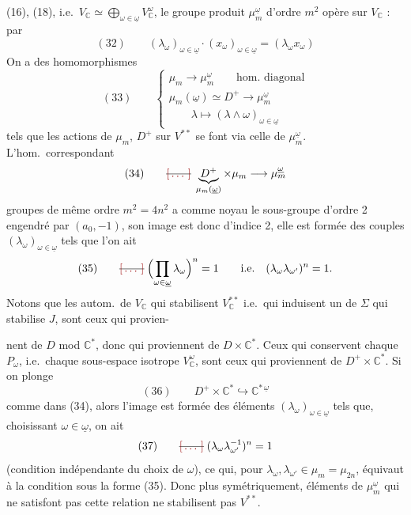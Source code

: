 \documentclass[11pt,a4paper]{article}
\begin{document}
(16), (18), i.e.\ $V_{\mathbb{C}} \simeq \bigoplus_{\omega \in
\underline{\omega}} V_{\mathbb{C}}^{\omega}$,  le groupe
produit $\mu_m^{\underline{\omega}}$ d'ordre $m^{2}$ opère sur
$V_{\mathbb{C}}$ : par
\[
  (32)\qquad (\lambda_\omega)_{\omega \in \underline{\omega}} \cdot
  (x_\omega)_{\omega \in \underline{\omega}} = (\lambda_\omega x_\omega)
\]
On  a des homomorphismes
\[
  (33)\qquad
  \begin{cases}
    \mu_m \longrightarrow \mu_m^{\underline{\omega}}
      \qquad \text{hom.\ diagonal} \\
    \mu_m(\underline{\omega}) \simeq D^{+} \longrightarrow
      \mu_m^{\underline{\omega}} \\
    \qquad \lambda \longmapsto (\lambda \wedge \omega)_{\omega \in
      \underline{\omega}}
  \end{cases}
\]
tels que les actions de $\mu_m$, $D^{+}$ sur $V^{**}$ \struck{\ill{}} se
font via celle de $\mu_m^{\underline{\omega}}$. L'hom.\ correspondant
\[
  (34)\qquad \text{\struck{\ill{}}}\;
  \underbrace{D^{+}}_{\mu_m(\underline{\omega})} \times \mu_m
  \longrightarrow \mu_m^{\underline{\omega}}
\]
 groupes de même ordre $m^{2} = 4n^{2}$ a comme noyau le
sous-groupe d'ordre 2 engendré par \struck{\ill{}} $(a_0, -1)$, son image est
donc d'indice 2, elle est formée des couples
$(\lambda_\omega)_{\omega \in \underline{\omega}}$ tels que l'on ait
\[
  (35)\qquad \text{\struck{\ill{}}}\;
  \Bigl(\prod_{\omega \in \underline{\omega}} \lambda_\omega\Bigr)^{n} = 1
  \qquad \text{i.e.}\quad (\lambda_\omega \lambda_{\omega'})^{n} = 1 .
\]
Notons que les autom.\ de $V_{\mathbb{C}}$ qui stabilisent
$V_{\mathbb{C}}^{**}$ i.e.\ qui induisent un  de
$\Sigma$ qui stabilise $J$, sont ceux qui provien-

nent de $D$ mod $\mathbb{C}^{*}$, donc qui proviennent de
$D \times \mathbb{C}^{*}$. Ceux qui conservent \struck{\ill{}} chaque
$P_\omega$, i.e.\ chaque sous-espace isotrope $V_{\mathbb{C}}^{\omega}$,
sont ceux qui proviennent de $D^{+} \times \mathbb{C}^{*}$. Si on plonge
\[
  (36)\qquad D^{+} \times \mathbb{C}^{*} \hookrightarrow
  \mathbb{C}^{*\,\underline{\omega}}
\]
comme dans (34), alors l'image est formée des éléments
$(\lambda_\omega)_{\omega \in \underline{\omega}}$ tels que, choisissant
$\omega \in \underline{\omega}$, on ait
\[
  (37)\qquad \text{\struck{\ill{}}}\;
  (\lambda_\omega \lambda_{\omega'}^{-1})^{n} = 1
\]
(condition indépendante du choix de $\omega$), ce qui, pour
\struck{\ill{}} $\lambda_\omega, \lambda_{\omega'} \in \mu_m = \mu_{2n}$,
équivaut à la condition sous la forme (35). Donc plus symétriquement,
 éléments de $\mu_m^{\underline{\omega}}$ qui ne
satisfont pas cette relation ne stabilisent pas $V^{**}$.
\end{document}
